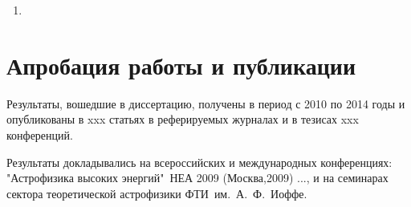 \begin{enumerate}
\item

\end{enumerate}


\section{Апробация работы и публикации}
Результаты, вошедшие в диссертацию, получены в период с 2010 по 2014
годы и опубликованы в xxx статьях в реферируемых журналах и в тезисах xxx конференций. 

Результаты докладывались на всероссийских и международных конференциях: 
"Астрофизика высоких энергий"\ НЕА 2009 (Москва,2009) ..., 
и на семинарах сектора теоретической астрофизики ФТИ~им.~А.~Ф.~Иоффе.

\clearpage